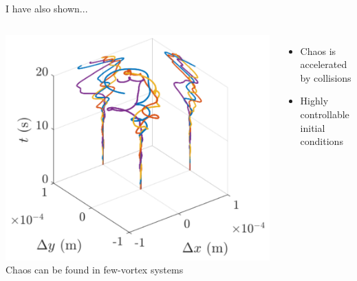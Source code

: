 \documentclass{beamer}
\begin{document}
\begin{frame}
\pause
\vspace{-0.5cm}
\begin{center}
I have also shown...
\end{center}
\vspace{-0.3cm}

\begin{columns}
\includegraphics[width=\textwidth]{../data/2d/evolution/evolution}
Chaos can be found in few-vortex systems
\begin{itemize}
\item Chaos is accelerated by collisions
\item Highly controllable initial conditions
\end{itemize}
\end{columns}


\end{frame}
\end{document}
